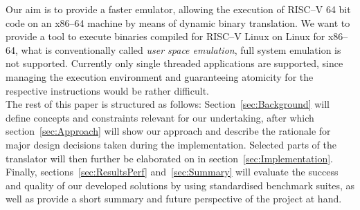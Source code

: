 Our aim is to provide a faster emulator, allowing the execution of RISC--V 64 bit code on an x86--64 machine by means of dynamic binary translation.
We want to provide a tool to execute binaries compiled for RISC--V Linux on Linux for x86--64, what is conventionally called \textit{user space emulation}, full system emulation is not supported.
Currently only single threaded applications are supported, since managing the execution environment and guaranteeing atomicity for the respective instructions would be rather difficult.\\

The rest of this paper is structured as follows:
Section~\ref{sec:Background} will define concepts and constraints relevant for our undertaking, after which section~\ref{sec:Approach} will show our approach and describe the rationale for major design decisions taken during the implementation.
Selected parts of the translator will then further be elaborated on in section~\ref{sec:Implementation}.
Finally, sections~\ref{sec:ResultsPerf} and~\ref{sec:Summary} will evaluate the success and quality of our developed solutions by using standardised benchmark suites, as well as provide a short summary and future perspective of the project at hand.














